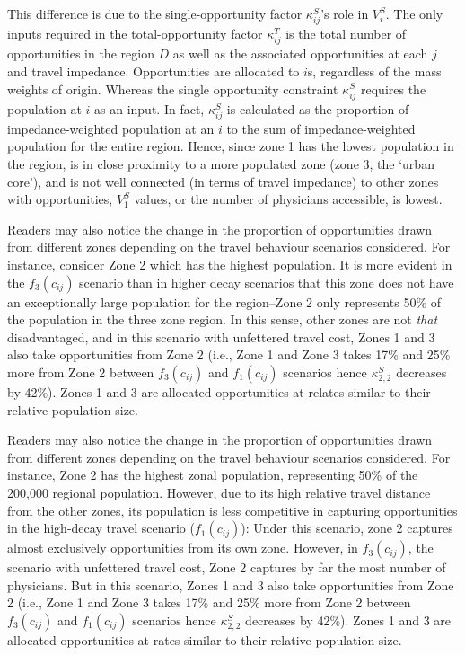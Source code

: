 \documentclass[
11pt, %
oneside, %
english, %
singlespacing, %
]{macthesis} %
\begin{document}
This difference is due to the single-opportunity factor \(\kappa^S_{ij}\)'s role in \(V_i^S\). The only inputs required in the total-opportunity factor \(\kappa^T_{ij}\) is the total number of opportunities in the region \(D\) as well as the associated opportunities at each \(j\) and travel impedance. Opportunities are allocated to \(i\)s, regardless of the mass weights of origin. Whereas the single opportunity constraint \(\kappa^S_{ij}\) requires the population at \(i\) as an input. In fact, \(\kappa^S_{ij}\) is calculated as the proportion of impedance-weighted population at an \(i\) to the sum of impedance-weighted population for the entire region. Hence, since zone 1 has the lowest population in the region, is in close proximity to a more populated zone (zone 3, the `urban core'), and is not well connected (in terms of travel impedance) to other zones with opportunities, \(V_{1}^S\) values, or the number of physicians accessible, is lowest.

Readers may also notice the change in the proportion of opportunities drawn from different zones depending on the travel behaviour scenarios considered. For instance, consider Zone 2 which has the highest population. It is more evident in the \(f_3(c_{ij})\) scenario than in higher decay scenarios that this zone does not have an exceptionally large population for the region--Zone 2 only represents 50\% of the population in the three zone region. In this sense, other zones are not \emph{that} disadvantaged, and in this scenario with unfettered travel cost, Zones 1 and 3 also take opportunities from Zone 2 (i.e., Zone 1 and Zone 3 takes 17\% and 25\% more from Zone 2 between \(f_3(c_{ij})\) and \(f_1(c_{ij})\) scenarios hence \(\kappa_{2,2}^S\) decreases by 42\%). Zones 1 and 3 are allocated opportunities at relates similar to their relative population size.

Readers may also notice the change in the proportion of opportunities drawn from different zones depending on the travel behaviour scenarios considered. For instance, Zone 2 has the highest zonal population, representing 50\% of the 200,000 regional population. However, due to its high relative travel distance from the other zones, its population is less competitive in capturing opportunities in the high-decay travel scenario (\(f_1(c_{ij})\)): Under this scenario, zone 2 captures almost exclusively opportunities from its own zone. However, in \(f_3(c_{ij})\), the scenario with unfettered travel cost, Zone 2 captures by far the most number of physicians. But in this scenario, Zones 1 and 3 also take opportunities from Zone 2 (i.e., Zone 1 and Zone 3 takes 17\% and 25\% more from Zone 2 between \(f_3(c_{ij})\) and \(f_1(c_{ij})\) scenarios hence \(\kappa_{2,2}^S\) decreases by 42\%). Zones 1 and 3 are allocated opportunities at rates similar to their relative population size.
\end{document}
